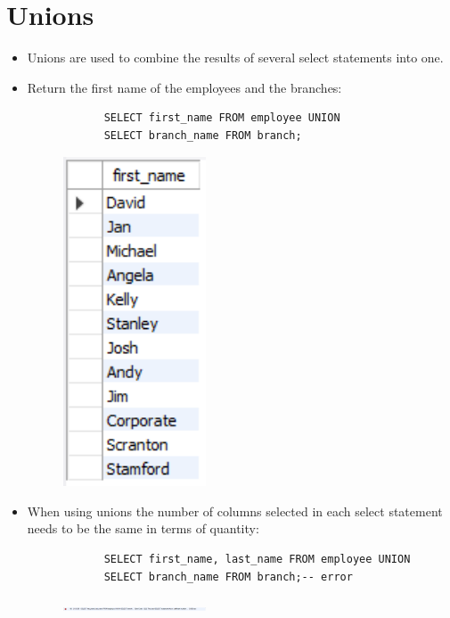 \section{Unions}
\begin{itemize}
    \item Unions are used to combine the results of several select statements into one.
    \item Return the first name of the employees and the branches:
        \begin{verbatim}
            SELECT first_name FROM employee UNION
            SELECT branch_name FROM branch;
        \end{verbatim}
        \begin{figure}[H]
            \centering
            \includegraphics[width=0.4\textwidth]{./Figs/2020-12-24-21-02-55.png}
        \end{figure}
    
    \item When using unions the number of columns selected in each select statement needs to be the same in terms of quantity:
        \begin{verbatim}
            SELECT first_name, last_name FROM employee UNION
            SELECT branch_name FROM branch;-- error
        \end{verbatim}
        \begin{figure}[H]
            \centering
            \includegraphics[width=0.4\textwidth]{./Figs/2020-12-24-21-03-18.png}
        \end{figure}
    

\end{itemize}
